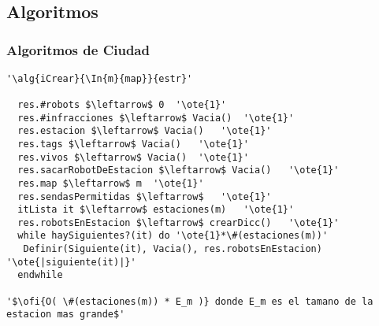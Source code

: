   ~     
  


\subsection{Algoritmos}

  \subsubsection{Algoritmos de Ciudad}

  \lstset{style=alg}

   \begin{lstlisting}[mathescape]
'\alg{iCrear}{\In{m}{map}}{estr}'

  res.#robots $\leftarrow$ 0  '\ote{1}'
  res.#infracciones $\leftarrow$ Vacia()  '\ote{1}'
  res.estacion $\leftarrow$ Vacia()   '\ote{1}'
  res.tags $\leftarrow$ Vacia()   '\ote{1}'
  res.vivos $\leftarrow$ Vacia()  '\ote{1}'
  res.sacarRobotDeEstacion $\leftarrow$ Vacia()   '\ote{1}'
  res.map $\leftarrow$ m  '\ote{1}'
  res.sendasPermitidas $\leftarrow$   '\ote{1}' 
  itLista it $\leftarrow$ estaciones(m)   '\ote{1}'
  res.robotsEnEstacion $\leftarrow$ crearDicc()   '\ote{1}'
  while haySiguientes?(it) do '\ote{1}*\#(estaciones(m))'
   Definir(Siguiente(it), Vacia(), res.robotsEnEstacion) '\ote{|siguiente(it)|}'
  endwhile
  
'$\ofi{O( \#(estaciones(m)) * E_m )} donde E_m es el tamano de la estacion mas grande$'
\end{lstlisting}

